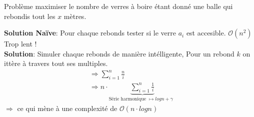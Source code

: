 \begin{frame}
    \frametitle{\problemtitle}
        \begin{block}
            {Problème} maximiser le nombre de verres à boire étant donné une balle qui rebondis tout les $x$ mètres.
        \end{block}
        \pause
        \textbf{Solution Naïve}: Pour chaque rebonds tester si le verre $a_i$ est accesible. $\mathcal O(n^2)$ Trop lent !\\
        \pause
        \textbf{Solution}: Simuler chaque rebonds de manière intélligente, Pour un rebond $k$ on ittère à travers tout ses multiples. \\
        \pause
        \begin{align}
            &\Rightarrow \sum_{i=1}^{n} \frac{n}{i}\\
            &\Rightarrow n \cdot \underbrace{\sum_{i=1}^{n} \frac{1}{i}}_{\text{Série harmonique $\mapsto log n + \gamma$ }}
        \end{align}
        $\Rightarrow$ ce qui mène à une complexité de $\mathcal O(n \cdot log n)$

\end{frame}
